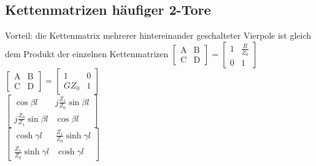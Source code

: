 \documentclass[english]{latex4ei/latex4ei_sheet}
\begin{document}
\begin{sectionbox}
	\subsection{Kettenmatrizen häufiger 2-Tore}
	Vorteil: die Kettenmatrix mehrerer hintereinander geschalteter Vierpole ist gleich dem Produkt der einzelnen Kettenmatrizen
	$\left[\begin{array}{cc}
		\mathrm{A} & \mathrm{B} \\
		\mathrm{C} & \mathrm{D}
		\end{array}\right]=\left[\begin{array}{cc}
		1 & \frac{R}{Z_{0}} \\
		0 & 1
		\end{array}\right]$ \\
		$\left[\begin{array}{cc}
			\mathrm{A} & \mathrm{B} \\
			\mathrm{C} & \mathrm{D}
			\end{array}\right]=\left[\begin{array}{cc}
			1 & 0 \\
			G Z_{0} & 1
			\end{array}\right]$\\
		$\left[\begin{array}{cc}
			\cos \beta l & j \frac{Z_{1}}{Z_{0}} \sin \beta l \\
			j \frac{Z_{0}}{Z_{1}} \sin \beta l & \cos \beta l
			\end{array}\right]$\\
		$\left[\begin{array}{cc}
			\cosh \gamma l & \frac{Z_{1}}{Z_{0}} \sinh \gamma l \\
			\frac{Z_{1}}{Z_{0}} \sinh \gamma l & \cosh \gamma l
			\end{array}\right]$ \\

\end{sectionbox}
\end{document}
